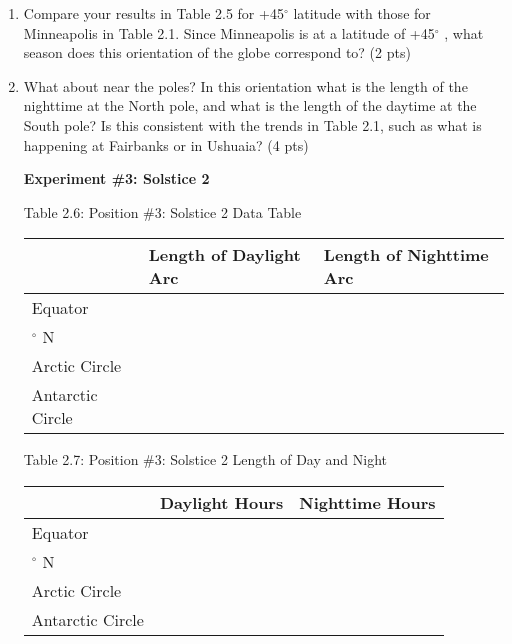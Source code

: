 \documentclass[notitlepage]{article}
\begin{document}
\begin{enumerate}
\vspace{1cm}

\item Compare your results in Table 2.5 for +45$^{\circ}$ latitude with those for Minneapolis in Table 2.1. Since Minneapolis is at a latitude of +45$^{\circ}$ , what season does this orientation of the globe correspond to? (2 pts) \\
\vspace{2cm}

\item What about near the poles? In this orientation what is the length of the nighttime at the North pole, and what is the length of the daytime at the South pole? Is this consistent with the trends in Table 2.1, such as what is happening at Fairbanks or in Ushuaia? (4 pts) \\
\vspace{3cm}
\newpage

{\bf Experiment \#3: Solstice 2}\\
\begin{center}
Table 2.6: Position \#3: Solstice 2 Data Table
\begin{table}[h]
\centering
\begin{tabular}{| >{\centering\arraybackslash} m{2cm} | >{\centering\arraybackslash} m{5cm} | >{\centering\arraybackslash} m{5cm} | }
\hline
{\bf Latitude} & {\bf Length of Daylight Arc} & {\bf Length of Nighttime Arc}\\
\hline
Equator & & \\[0.5cm]
\hline
45$^{\circ}$ N & & \\[0.5cm]
\hline
Arctic Circle & & \\[0.5cm]
\hline
Antarctic Circle & & \\[0.5cm]
\hline
\end{tabular}
\end{table}

Table 2.7: Position \#3: Solstice 2 Length of Day and Night
\begin{table}[h]
\centering
\begin{tabular}{| >{\centering\arraybackslash} m{2cm} | >{\centering\arraybackslash} m{5cm} | >{\centering\arraybackslash} m{5cm} | }
\hline
{\bf Latitude} & {\bf Daylight Hours} & {\bf Nighttime Hours}\\
\hline
Equator & & \\[0.5cm]
\hline
45$^{\circ}$ N & & \\[0.5cm]
\hline
Arctic Circle & & \\[0.5cm]
\hline
Antarctic Circle & & \\[0.5cm]
\hline
\end{tabular}
\end{table}


\end{center}
\end{enumerate}
\end{document}
